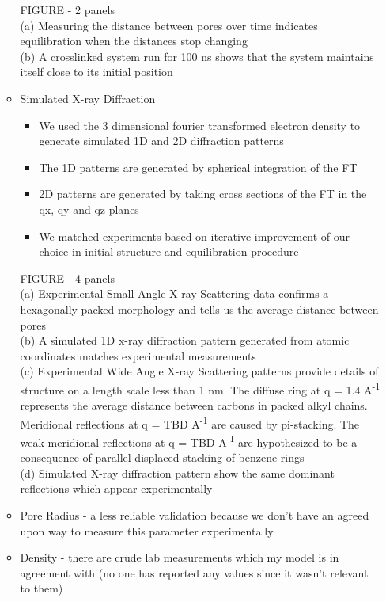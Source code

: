 \documentclass{article}
\begin{document}
\begin{itemize}
\begin{itemize}
		FIGURE - 2 panels \\
		(a) Measuring the distance between pores over time indicates equilibration when the distances stop changing \\
		(b) A crosslinked system run for 100 ns shows that the system maintains itself close to its initial position \\
 
		\item Simulated X-ray Diffraction
		\begin{itemize}
			\item We used the 3 dimensional fourier transformed electron density to generate simulated 1D and 2D diffraction patterns
			\item The 1D patterns are generated by spherical integration of the FT
			\item 2D patterns are generated by taking cross sections of the FT in the qx, qy and qz planes
			\item We matched experiments based on iterative improvement of our choice in initial structure and equilibration procedure
		\end{itemize}
	        
		FIGURE - 4 panels \\
        	(a) Experimental Small Angle X-ray Scattering data confirms a hexagonally packed morphology and tells us the average distance between pores \\
        	(b) A simulated 1D x-ray diffraction pattern generated from atomic coordinates matches experimental measurements \\
        	(c) Experimental Wide Angle X-ray Scattering patterns provide details of structure on a length scale less than 1 nm. The diffuse ring at q = 1.4 A\textsuperscript{-1} represents the average distance between carbons in packed alkyl chains. Meridional reflections at q = TBD A\textsuperscript{-1} are caused by pi-stacking. The weak meridional reflections at q = TBD A\textsuperscript{-1} are hypothesized to be a consequence of parallel-displaced stacking of benzene rings \\
		(d) Simulated X-ray diffraction pattern show the same dominant reflections which appear experimentally

		\item Pore Radius - a less reliable validation because we don't have an agreed upon way to measure this parameter experimentally
		\item Density - there are crude lab measurements which my model is in agreement with (no one has reported any values since it wasn't relevant to them)
	\end{itemize}


\end{itemize}
\end{document}
